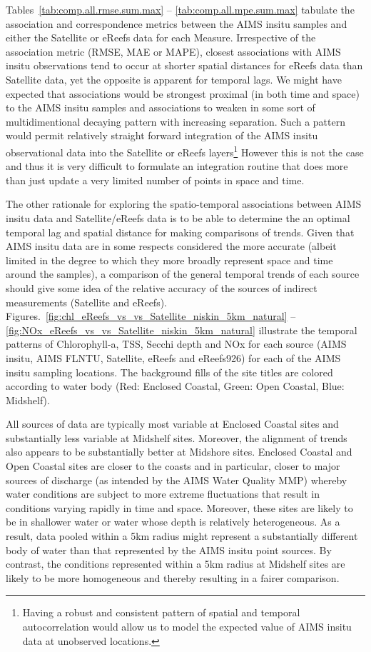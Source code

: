Tables~\ref{tab:comp.all.rmse.sum.max} -- \ref{tab:comp.all.mpe.sum.max} tabulate the association
and correspondence metrics between the AIMS insitu samples and either the Satellite or eReefs data
for each Measure.  Irrespective of the association metric (RMSE, MAE or MAPE), closest associations
with AIMS insitu observations tend to occur at shorter spatial distances for eReefs data than
Satellite data, yet the opposite is apparent for temporal lags.  We might have expected that
associations would be strongest proximal (in both time and space) to the AIMS insitu samples and
associations to weaken in some sort of multidimentional decaying pattern with increasing separation.
Such a pattern would permit relatively straight forward integration of the AIMS insitu observational
data into the Satellite or eReefs layers\footnote{Having a robust and consistent pattern of spatial
and temporal autocorrelation would allow us to model the expected value of AIMS insitu data at
unobserved locations.}  However this is not the case and thus it is very difficult to formulate an
integration routine that does more than just update a very limited number of points in space and
time.

The other rationale for exploring the spatio-temporal associations between AIMS insitu data and
Satellite/eReefs data is to be able to determine the an optimal temporal lag and spatial distance
for making comparisons of trends.  Given that AIMS insitu data are in some respects considered the
more accurate (albeit limited in the degree to which they more broadly represent space and time
around the samples), a comparison of the general temporal trends of each source should give some
idea of the relative accuracy of the sources of indirect measurements (Satellite and eReefs).
Figures.~\ref{fig:chl_eReefs_vs_vs_Satellite_niskin_5km_natural} --
\ref{fig:NOx_eReefs_vs_vs_Satellite_niskin_5km_natural} illustrate the temporal patterns of
Chlorophyll-a, TSS, Secchi depth and NOx for each source (AIMS insitu, AIMS FLNTU, Satellite, eReefs
and eReefs926) for each of the AIMS insitu sampling locations.  The background fills of the site
titles are colored according to water body (Red: Enclosed Coastal, Green: Open Coastal, Blue:
Midshelf).

All sources of data are typically most variable at Enclosed Coastal sites and substantially less
variable at Midshelf sites.  Moreover, the alignment of trends also appears to be substantially
better at Midshore sites.  Enclosed Coastal and Open Coastal sites are closer to the coasts and in
particular, closer to major sources of discharge (as intended by the AIMS Water Quality MMP) whereby
water conditions are subject to more extreme fluctuations that result in conditions varying rapidly
in time and space.  Moreover, these sites are likely to be in shallower water or water whose depth
is relatively heterogeneous. As a result, data pooled within a 5km radius might represent a
substantially different body of water than that represented by the AIMS insitu point sources.  By
contrast, the conditions represented within a 5km radius at Midshelf sites are likely to be more
homogeneous and thereby resulting in a fairer comparison.

